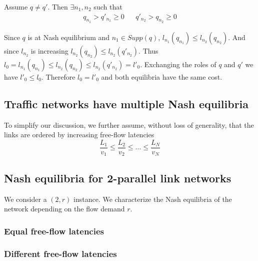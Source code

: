 Assume $q \neq q'$. Then $\exists n_1, n_2$ such that
\begin{align*}
q_{n_1} > q'_{n_1} \geq 0 && q'_{n_2} > q_{n_2} \geq 0
\end{align*}

Since $q$ is at Nash equilibrium and $n_1 \in Supp(q)$, $l_{n_1}(q_{n_1}) \leq l_{n_2}(q_{n_2})$. And since $l_{n_2}$ is increasing $l_{n_2}(q_{n_2}) \leq l_{n_2}(q'_{n_2})$. Thus $l_0 = l_{n_1}(q_{n_1}) \leq l_{n_2}(q_{n_2}) \leq l_{n_2}(q'_{n_2}) = l'_0$. Exchanging the roles of $q$ and $q'$ we have $l'_0 \leq l_0$. Therefore $l_0 = l'_0$ and both equilibria have the same cost.

\subsection{Traffic networks have multiple Nash equilibria}
To simplify our discussion, we further assume, without loss of generality, that the links are ordered by increasing free-flow latencies
\[
\frac{L_1}{v_1} \leq \frac{L_2}{v_2} \leq \dots \leq \frac{L_N}{v_N}
\]


\subsection{Nash equilibria for 2-parallel link networks}
We consider a $(2, r)$ instance. We characterize the Nash equilibria of the network depending on the flow demand $r$.

\subsubsection{Equal free-flow latencies}

\subsubsection{Different free-flow latencies}


